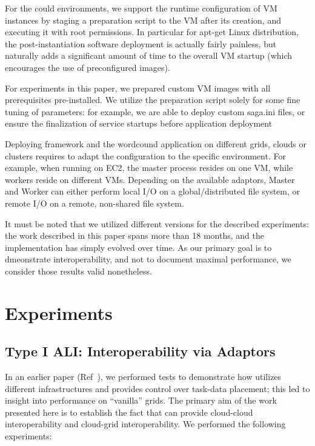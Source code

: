\documentclass[3p,twocolumn]{elsarticle}
\begin{document}
For the could environments, we support the runtime configuration of VM
instances by staging a preparation script to the VM after its
creation, and executing it with root permissions.  In particular for
apt-get Linux distribution, the post-instantiation software deployment
is actually fairly painless, but naturally adds a significant amount
of time to the overall VM startup (which encourages the use of
preconfigured images).

For experiments in this paper, we prepared custom VM images with all
prerequisites pre-installed.  We utilize the preparation script solely
for some fine tuning of parameters: for example, we are able to deploy
custom saga.ini files, or ensure the finalization of service startups
before application deployment

Deploying \sagamapreduce framework and the wordcound application on
different grids, clouds or clusters requires to adapt the configuration
to the specific environment.  For example, when running \sagamapreduce
on EC2, the master process resides on one VM, while workers reside on
different VMs.  Depending on the available adaptors, Master and Worker
can either perform local I/O on a global/distributed file system, or
remote I/O on a remote, non-shared file system.

It must be noted that we utilized different \smr versions for the
described experiments: the work described in this paper spans more
than 18 months, and the \smr implementation has simply evolved over
time.  As our primary goal is to dmeonstrate interoperability, and not
to document maximal performance, we consider those results valid
nonetheless.


\section{Experiments} 
\label{sec:exp}

\subsection{Type I ALI: Interoperability via Adaptors}

In an earlier paper (Ref~\cite{saga_ccgrid09}), we performed tests to
demonstrate how \sagamapreduce utilizes different infrastructures and
provides control over task-data placement; this led to insight into
performance on ``vanilla'' grids.  The primary aim of the work
presented here is to establish the fact that \sagamapreduce can
provide cloud-cloud interoperability and cloud-grid interoperability.
We performed the following experiments:
\end{document}
